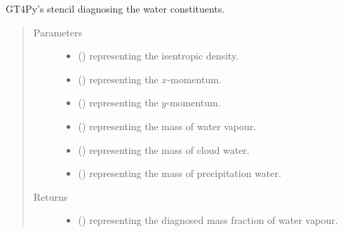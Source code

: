 \documentclass[letterpaper,10pt,english]{sphinxmanual}
\begin{document}
\begin{fulllineitems}
\begin{fulllineitems}
\end{fulllineitems}


\begin{fulllineitems}
\label{\detokenize{api:dycore.diagnostic_isentropic.DiagnosticIsentropic._defs_stencil_diagnosing_water_constituents}}
GT4Py’s stencil diagnosing the water constituents.
\begin{quote}\begin{description}
\item[{Parameters}] \leavevmode\begin{itemize}
\item {} 
 () \textendash{}  representing the isentropic density.

\item {} 
 () \textendash{}  representing the \(x\)-momentum.

\item {} 
 () \textendash{}  representing the \(y\)-momentum.

\item {} 
 () \textendash{}  representing the mass of water vapour.

\item {} 
 () \textendash{}  representing the mass of cloud water.

\item {} 
 () \textendash{}  representing the mass of precipitation water.

\end{itemize}

\item[{Returns}] \leavevmode
\begin{itemize}
\item {} 
 () \textendash{}  representing the diagnosed mass fraction of water vapour.


\end{itemize}
\end{description}
\end{quote}
\end{fulllineitems}
\end{fulllineitems}
\end{document}
